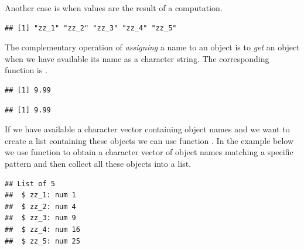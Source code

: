 \documentclass[krantz2]{krantz}\usepackage{knitr}
\begin{document}
Another case is when  values are the result of a computation.

\begin{knitrout}\footnotesize
{}\color{fgcolor}\begin{kframe}
\begin{alltt}
   \hlopt{:}\hlstd{) \{}
   \hlstd{(}\hlstd{(}  \hlstd{=} \hlopt{^}\hlstd{)}
\hlstd{\}}
\hlstd{(} \hlstd{=} \hlstd{)}
\end{alltt}
\begin{verbatim}
## [1] "zz_1" "zz_2" "zz_3" "zz_4" "zz_5"
\end{verbatim}
\end{kframe}
\end{knitrout}

The complementary operation of \emph{assigning} a name to an object is to \emph{get} an object when we have available its name as a character string. The corresponding function is .

\begin{knitrout}\footnotesize
{}\color{fgcolor}\begin{kframe}
\begin{alltt}
\hlstd{(}\hlstd{)}
\end{alltt}
\begin{verbatim}
## [1] 9.99
\end{verbatim}
\begin{alltt}
\hlstd{(}\hlstd{)}
\end{alltt}
\begin{verbatim}
## [1] 9.99
\end{verbatim}
\end{kframe}
\end{knitrout}

If we have available a character vector containing object names and we want to create a list containing these objects we can use function . In the example below we use function  to obtain a character vector of object names matching a specific pattern and then collect all these objects into a list.

\begin{knitrout}\footnotesize
{}\color{fgcolor}\begin{kframe}
\begin{alltt}
 \hlkwb{<-} \hlstd{(} \hlstd{=} \hlstd{)}
 \hlkwb{<-} 
\end{alltt}
\begin{verbatim}
## List of 5
##  $ zz_1: num 1
##  $ zz_2: num 4
##  $ zz_3: num 9
##  $ zz_4: num 16
##  $ zz_5: num 25
\end{verbatim}
\end{kframe}
\end{knitrout}
\end{document}
